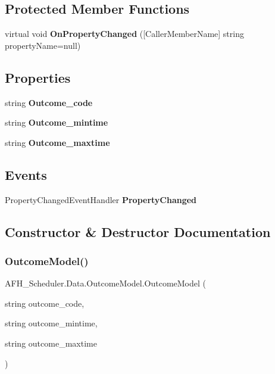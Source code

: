 \subsection*{Protected Member Functions}
\begin{DoxyCompactItemize}
\item 
virtual void \textbf{ On\+Property\+Changed} ([Caller\+Member\+Name] string property\+Name=null)
\end{DoxyCompactItemize}
\subsection*{Properties}
\begin{DoxyCompactItemize}
\item 
string \textbf{ Outcome\+\_\+code}\hspace{0.3cm}{\ttfamily  [get, set]}
\item 
string \textbf{ Outcome\+\_\+mintime}\hspace{0.3cm}{\ttfamily  [get, set]}
\item 
string \textbf{ Outcome\+\_\+maxtime}\hspace{0.3cm}{\ttfamily  [get, set]}
\end{DoxyCompactItemize}
\subsection*{Events}
\begin{DoxyCompactItemize}
\item 
Property\+Changed\+Event\+Handler \textbf{ Property\+Changed}
\end{DoxyCompactItemize}


\subsection{Constructor \& Destructor Documentation}
\mbox{\label{class_a_f_h___scheduler_1_1_data_1_1_outcome_model_a555c7b4d84ebd2f93048d04e4dc30f62}} 
\subsubsection{OutcomeModel()}
{\footnotesize\ttfamily A\+F\+H\+\_\+\+Scheduler.\+Data.\+Outcome\+Model.\+Outcome\+Model (\begin{DoxyParamCaption}\item[{string}]{outcome\+\_\+code,  }\item[{string}]{outcome\+\_\+mintime,  }\item[{string}]{outcome\+\_\+maxtime }\end{DoxyParamCaption})}




